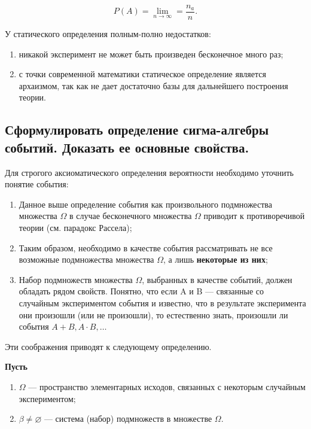 \begin{equation}
	P(A) = \lim\limits_{n \rightarrow \infty} = \frac{n_a}{n}.
\end{equation}

У статического определения полным-полно недостатков:

\begin{enumerate}
	\item никакой эксперимент не может быть произведен бесконечное много раз;
	\item с точки современной математики статическое определение является архаизмом, так как не дает достаточно базы для дальнейшего построения теории.
\end{enumerate}

\subsection{Сформулировать определение сигма-алгебры событий. Доказать ее основные свойства.}

Для строгого аксиоматического определения вероятности необходимо уточнить понятие события:

\begin{enumerate}
	\item Данное выше определение события как произвольного подмножества множества $\Omega$ в случае бесконечного множества $\Omega$ приводит к противоречивой теории (см. парадокс Рассела);
	\item Таким образом, необходимо в качестве события рассматривать не все возможные подмножества множества $\Omega$, а лишь \textbf{некоторые из них}; 
	\item Набор подмножеств множества $\Omega$, выбранных в качестве событий, должен обладать рядом свойств. Понятно, что если A и B --- связанные со случайным экспериментом события и известно, что в результате эксперимента они произошли (или не произошли), то естественно знать, произошли ли события $A + B, A \cdot B, \dots$
\end{enumerate}

Эти соображения приводят к следующему определению.

\textbf{Пусть} 

\begin{enumerate}
	\item $\Omega$ --- пространство элементарных исходов, связанных с некоторым случайным экспериментом; 
	\item $\beta \neq \varnothing$ --- система (набор) подмножеств в множестве $\Omega$.
\end{enumerate}


